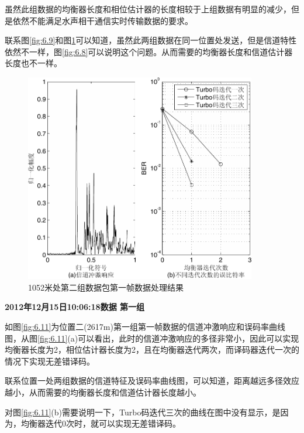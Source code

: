 虽然此组数据的均衡器长度和相位估计器的长度相较于上组数据有明显的减少，但是依然不能满足水声相干通信实时传输数据的要求。

联系图\ref{fig:6.9}和图\ref{fig:6.10}可以知道，虽然此两组数据在同一位置处发送，但是信道特性依然不一样，图\ref{fig:6.8}可以说明这个问题。从而需要的均衡器长度和信道估计器长度也不一样。

\begin{figure}[htb]
  \begin{center}
    \includegraphics[width=0.9\textwidth]{images/result_1_2.pdf}
  \end{center}
  \caption{1052米处第二组数据包第一帧数据处理结果}
  \label{fig:6.10}
\end{figure}

\textbf{\sihao 2012年12月15日10:06:18数据 第一组} 

如图\ref{fig:6.11}为位置二(2617m)第一组第一帧数据的信道冲激响应和误码率曲线图，从图\ref{fig:6.11}(a)可以看出，此时的信道冲激响应的多径非常小，因此可以实现均衡器长度为2，相位估计器长度为2，且在均衡器迭代两次，而译码器迭代一次的情况下实现无差错译码。

联系位置一处两组数据的信道特征及误码率曲线图，可以知道，距离越远多径效应越小，从而需要的均衡器长度和信道估计器长度越小。

对图\ref{fig:6.11}(b)需要说明一下，Turbo码迭代三次的曲线在图中没有显示，是因为，均衡器迭代0次时，就可以实现无差错译码。


